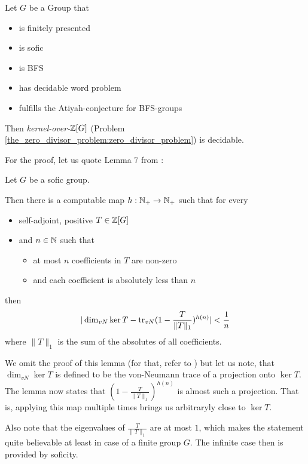 \begin{Theorem}
	\label{decidable_zero_divisors:theorem}
	Let $G$ be a Group that
	\begin{itemize}
		\item is finitely presented
		\item is sofic
		\item is BFS
		\item has decidable word problem
		\item fulfills the Atiyah-conjecture for BFS-groups
	\end{itemize}

	Then \emph{kernel-over-$\mathbb{Z}[G]$} (Problem \ref{the_zero_divisor_problem:zero_divisor_problem}) is decidable.
\end{Theorem}
For the proof, let us quote Lemma 7 from \cite{gra14-2}:
\begin{Lemma}
		\label{decidable_zero_divisors:lemma_sofic}
	Let $G$ be a sofic group.

	Then there is a computable map $h: \mathbb{N}_+ \to \mathbb{N}_+$ such that for every
	\begin{itemize}
		\item self-adjoint, positive $T \in \mathbb{Z}[G]$
		\item and $n \in \mathbb{N}$ such that
		\begin{itemize}
			\item at most $n$ coefficients in $T$ are non-zero
			\item and each coefficient is absolutely less than $n$
		\end{itemize}
	\end{itemize}
	then
	\begin{align*}
		| \dim_{vN} \ker T - \operatorname{tr}_{vN}(1 - \frac{T}{\|T\|_1})^{h(n)} | < \frac{1}{n}
	\end{align*}
	where $\|T\|_1$ is the sum of the absolutes of all coefficients.
\end{Lemma}
We omit the proof of this lemma (for that, refer to \cite{gra14-2}) but let us note, that $\dim_{vN} \ker T$ is defined to be the von-Neumann trace of a projection onto $\ker T$.
The lemma now states that $(1 - \frac{T}{\|T\|_1})^{h(n)}$ is almost such a projection. That is, applying this map multiple times brings us arbitraryly close to $\ker T$.

Also note that the eigenvalues of $\frac{T}{\|T\|_1}$ are at most $1$, which makes the statement quite believable at least in case of a finite group $G$.
The infinite case then is provided by soficity.

